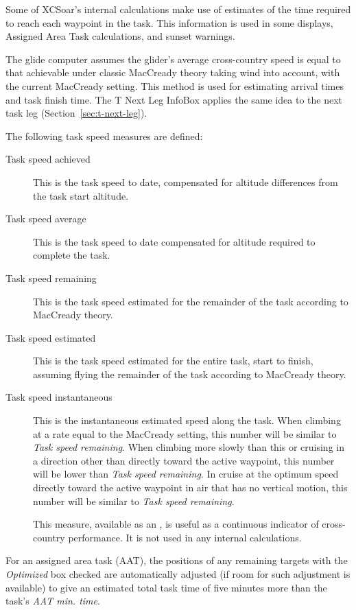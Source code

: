 Some of XCSoar's internal calculations make use of estimates of the
time required to reach each waypoint in the task.  This information is
used in some {\InfoBox} displays, Assigned Area Task calculations, and
sunset warnings.

The glide computer assumes the glider's average cross-country speed is
equal to that achievable under classic MacCready theory taking wind
into account, with the current MacCready setting.  This method is used
for estimating arrival times and task finish time.  The T Next Leg
InfoBox applies the same idea to the next task leg
(Section~\ref{sec:t-next-leg}).

The following task speed measures are defined:
\begin{description}
\item[Task speed achieved]  This is the task speed to date, compensated
for altitude differences from the task start altitude.
\item[Task speed average]  This is the task speed to date compensated
for altitude required to complete the task.
\item[Task speed remaining]  This is the task speed estimated for the
  remainder of the task according to MacCready theory.
\item[Task speed estimated]  This is the task speed estimated for the entire 
task, start to finish, assuming flying the remainder of the task according 
to MacCready theory.
\item[Task speed instantaneous]  This is the instantaneous estimated speed 
along the task.  When climbing at a rate equal to the MacCready setting, this 
number will be similar to \emph{Task speed remaining}.  When climbing more slowly 
than this or cruising in a direction other than directly toward the active 
waypoint, this number will be lower than \emph{Task speed remaining}.  In cruise 
at the optimum speed directly toward the active waypoint in air that has no 
vertical motion, this number will be similar to \emph{Task speed remaining}.

This measure, available as an {\InfoBox}, is useful as a continuous
indicator of cross-country performance.  It is not used in any
internal calculations.
\end{description}

\tip{}For an assigned area task (AAT), the positions of any remaining targets 
with the \emph{Optimized} box checked are automatically adjusted (if room for 
such adjustment is available) to give an estimated total task time of five 
minutes more than the task's \emph{AAT min. time}.

